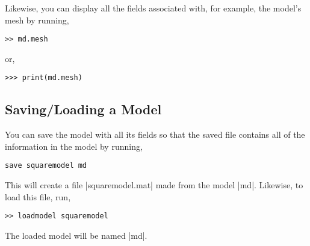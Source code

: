 Likewise, you can display all the fields associated with, for example, the model's mesh by running,
\begin{lstlisting}
>> md.mesh
\end{lstlisting}
or,
\begin{lstlisting}
>>> print(md.mesh)
\end{lstlisting}

\subsection{Saving/Loading a Model}
You can save the model with all its fields so that the saved file contains all of the information in the model by running,
\begin{lstlisting}
save squaremodel md
\end{lstlisting}
This will create a file \lstinlinebg|squaremodel.mat| made from the model \lstinlinebg|md|. Likewise, to load this file, run,
\begin{lstlisting}
>> loadmodel squaremodel
\end{lstlisting}
The loaded model will be named \lstinlinebg|md|.

\clearpage %
